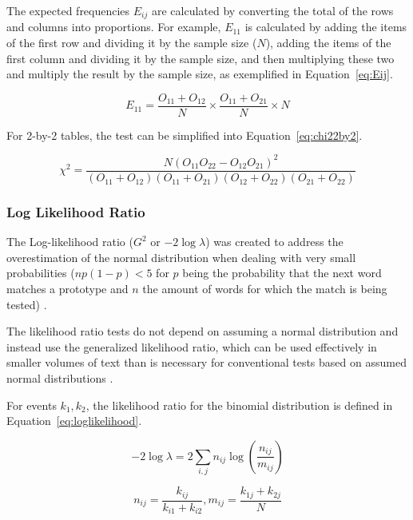 The expected frequencies $E_{ij}$ are calculated by converting the total of the
rows and columns into proportions. For example, $E_{11}$ is calculated by adding
the items of the first row and dividing it by the sample size ($N$), adding the
items of the first column and dividing it by the sample size, and then
multiplying these two and multiply the result by the sample size, as exemplified
in Equation~\ref{eq:Eij}.

\begin{equation}
  \label{eq:Eij}
  E_{11} = \frac{O_{11} + O_{12}}{N} \times \frac{O_{11} + O_{21}}{N} \times N
\end{equation}

For 2-by-2 tables, the test can be simplified into Equation~\ref{eq:chi22by2}.

\begin{equation}
  \label{eq:chi22by2}
  \chi^2 =  \frac{N(O_{11}O_{22} - O_{12}O_{21})^2}
            {(O_{11} + O_{12}) (O_{11} + O_{21})
             (O_{12} + O_{22}) (O_{21} + O_{22})}
\end{equation}


\subsubsection*{Log Likelihood Ratio}
\label{subsec:loglikeliood}

The Log-likelihood ratio ($G^2$ or $-2\log\lambda$) was created to address the
overestimation of the normal distribution when dealing with very small
probabilities ($np(1 - p) < 5$ for $p$ being the probability that the next word
matches a prototype and $n$ the amount of words for which the match is being
tested) \citep{dunning1993accurate}.

The likelihood ratio tests do not depend on assuming a normal distribution and
instead use the generalized likelihood ratio, which can be used effectively in
smaller volumes of text than is necessary for conventional tests based on
assumed normal distributions \citep{dunning1993accurate}.

For events $k_1,k_2$, the likelihood ratio for the binomial distribution is
defined in Equation~\ref{eq:loglikelihood}.

\begin{equation}
  \label{eq:loglikelihood}
  -2\log\lambda = 2 \sum_{i,j} n_{ij} \log \left( \frac{n_{ij}}{m_{ij}} \right)
\end{equation}

\begin{equation}
  n_{ij} = \frac{k_{ij}}{k_{i1} + k_{i2}}, m_{ij} = \frac{k_{1j} + k_{2j}}{N}
\end{equation}

